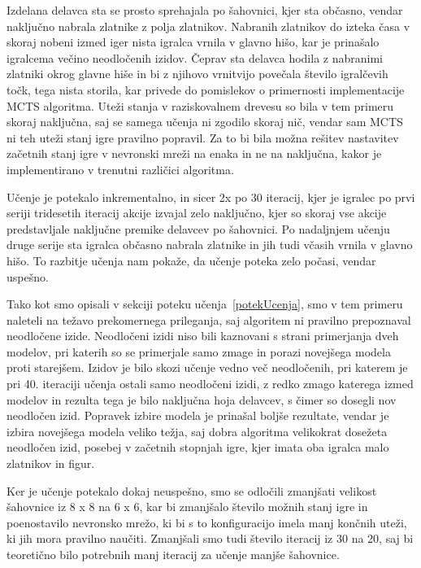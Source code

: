 \documentclass[a4paper, 12pt]{book}
\begin{document}
Izdelana delavca sta se prosto sprehajala po šahovnici, kjer sta občasno, vendar naključno nabrala zlatnike z polja zlatnikov.
Nabranih zlatnikov do izteka časa v skoraj nobeni izmed iger nista igralca vrnila v glavno hišo, kar je prinašalo igralcema večino neodločenih izidov.
Čeprav sta delavca hodila z nabranimi zlatniki okrog glavne hiše in bi z njihovo vrnitvijo povečala število igralčevih točk, tega nista storila, kar privede do pomislekov o primernosti implementacije MCTS algoritma.
Uteži stanja v raziskovalnem drevesu so bila v tem primeru skoraj naključna, saj se samega učenja ni zgodilo skoraj nič, vendar sam MCTS ni teh uteži stanj igre pravilno popravil.
Za to bi bila možna rešitev nastavitev začetnih stanj igre v nevronski mreži na enaka in ne na naključna, kakor je implementirano v trenutni različici algoritma.

Učenje je potekalo inkrementalno, in sicer 2x po 30 iteracij, kjer je igralec po prvi seriji tridesetih iteracij akcije izvajal zelo naključno, kjer so skoraj vse akcije predstavljale naključne premike delavcev po šahovnici.
Po nadaljnjem učenju druge serije sta igralca občasno nabrala zlatnike in jih tudi včasih vrnila v glavno hišo.
To razbitje učenja nam pokaže, da učenje poteka zelo počasi, vendar uspešno.

Tako kot smo opisali v sekciji poteku učenja~\ref{potekUcenja}, smo v tem primeru naleteli na težavo prekomernega prileganja, saj algoritem ni pravilno prepoznaval neodločene izide.
Neodločeni izidi niso bili kaznovani s strani primerjanja dveh modelov, pri katerih so se primerjale samo zmage in porazi novejšega modela proti starejšem.
Izidov je bilo skozi učenje vedno več neodločenih, pri katerem je pri 40. iteraciji učenja ostali samo neodločeni izidi, z redko zmago katerega izmed modelov in rezulta tega je bilo naključna hoja delavcev, s čimer so dosegli nov neodločen izid.
Popravek izbire modela je prinašal boljše rezultate, vendar je izbira novejšega modela veliko težja, saj dobra algoritma velikokrat dosežeta neodločen izid, posebej v začetnih stopnjah igre, kjer imata oba igralca malo zlatnikov in figur.

Ker je učenje potekalo dokaj neuspešno, smo se odločili zmanjšati velikost šahovnice iz 8 x 8 na 6 x 6, kar bi zmanjšalo število možnih stanj igre in poenostavilo nevronsko mrežo, ki bi s to konfiguracijo imela manj končnih uteži, ki jih mora pravilno naučiti.
Zmanjšali smo tudi število iteracij iz 30 na 20, saj bi teoretično bilo potrebnih manj iteracij za učenje manjše šahovnice.
\end{document}
